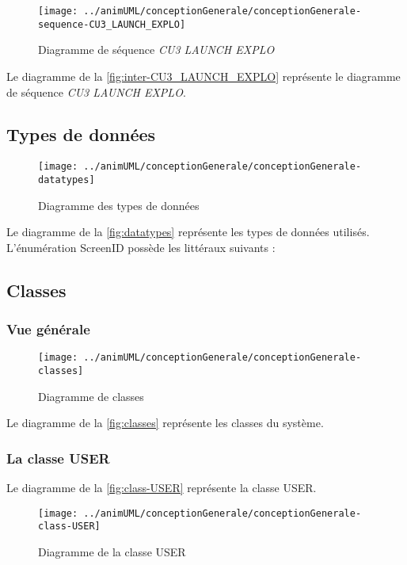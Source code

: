 \begin{figure}[H]
	\centering
	\texttt{[image: ../animUML/conceptionGenerale/conceptionGenerale-sequence-CU3\_LAUNCH\_EXPLO]}
	\caption{Diagramme de séquence \emph{CU3 LAUNCH EXPLO}}
	\label{fig:inter-CU3_LAUNCH_EXPLO}
\end{figure}
Le diagramme de la \autoref{fig:inter-CU3_LAUNCH_EXPLO} représente le diagramme de séquence \emph{CU3 LAUNCH EXPLO}.



\subsection{Types de données}

\begin{figure}[H]
	\centering
	\texttt{[image: ../animUML/conceptionGenerale/conceptionGenerale-datatypes]}
	\caption{Diagramme des types de données}
	\label{fig:datatypes}
\end{figure}
Le diagramme de la \autoref{fig:datatypes} représente les types de données utilisés.
\newline
L'énumération ScreenID possède les littéraux suivants :
\enumScreenIDLiteralDescriptions

\subsection{Classes}

\subsubsection{Vue générale}

\begin{figure}[H]
	\centering
	\texttt{[image: ../animUML/conceptionGenerale/conceptionGenerale-classes]}
	\caption{Diagramme de classes}
	\label{fig:classes}
\end{figure}
Le diagramme de la \autoref{fig:classes} représente les classes du système.

\subsubsection{La classe USER}

Le diagramme de la \autoref{fig:class-USER} représente la classe USER.
\begin{figure}[H]
	\centering
	\texttt{[image: ../animUML/conceptionGenerale/conceptionGenerale-class-USER]}
	\caption{Diagramme de la classe USER}
	\label{fig:class-USER}
\end{figure}


